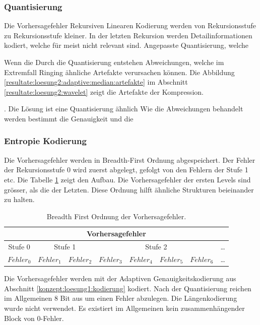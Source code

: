 \subsubsection{Quantisierung} \label{konzept:loesung2:resudial_quant}
Die Vorhersagefehler Rekursiven Linearen Kodierung werden von Rekursionsstufe zu Rekursionsstufe kleiner. In der letzten Rekursion werden Detailinformationen kodiert, welche für meist nicht relevant sind. Angepasste Quantisierung, welche

Wenn die 
Durch die Quantisierung entstehen Abweichungen, welche im Extremfall Ringing ähnliche Artefakte verursachen können. Die Abbildung \ref{resultate:loesung2:adaptive:median:artefakte} im Abschnitt \ref{resultate:loesung2:wavelet} zeigt die Artefakte der Kompression. 

. Die Lösung ist eine Quantisierung ähnlich 
 Wie die Abweichungen behandelt werden bestimmt die Genauigkeit und die

\subsubsection{Entropie Kodierung}
Die Vorhersagefehler werden in Breadth-First Ordnung abgespeichert. Der Fehler der Rekursionsstufe 0 wird zuerst abgelegt, gefolgt von den Fehlern der Stufe 1 etc. Die Tabelle \ref{konzept:loesung2:entropie:breath} zeigt den Aufbau. Die Vorhersagefehler der ersten Levels sind grösser, als die der Letzten. Diese Ordnung hilft ähnliche Strukturen beieinander zu halten.

\begin{table}[!htbp]
	\center
	\begin{tabular}{|c||c|c||c|c|c|c||c}
		\hline
		\multicolumn{8}{|c|}{Vorhersagefehler}\\\hline\hline
		 Stufe 0& \multicolumn{2}{|c||}{Stufe 1} & \multicolumn{4}{|c|}{Stufe 2} &\ldots \\\hline
		$Fehler_0$ & $Fehler_1$ &$Fehler_2$ &$Fehler_3$ & $Fehler_4$ & $Fehler_5$ & $Fehler_6$   & \ldots \\\hline
	\end{tabular}
	\caption{Breadth First Ordnung der Vorhersagefehler.}
	\label{konzept:loesung2:entropie:breath}
\end{table}
Die Vorhersagefehler werden mit der Adaptiven Genauigkeitskodierung aus Abschnitt \ref{konzept:loesung1:kodierung} kodiert. Nach der Quantisierung reichen im Allgemeinen 8 Bit aus um einen Fehler abzulegen. Die Längenkodierung wurde nicht verwendet. Es existiert im Allgemeinen kein zusammenhängender Block von 0-Fehler. 